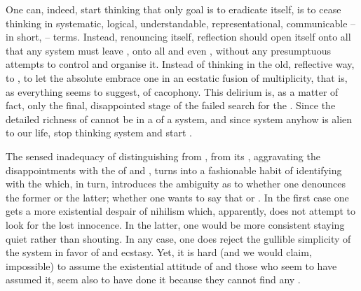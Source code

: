 One can, indeed, start thinking that  only goal is to eradicate
itself, is to cease thinking in systematic, logical, understandable, representational,
communicable -- in short,  -- terms.  Instead, renouncing itself,
reflection should open itself onto all that any system must leave ,
onto all  and even , without any
presumptuous attempts
to control and organise it. Instead of thinking in the old, reflective way, to
, to let the absolute  embrace one in an ecstatic
fusion of multiplicity, that is, as everything seems to suggest, of cacophony.
This delirium is, as a matter of fact, only the final, disappointed stage of the
failed search for the
. Since the detailed richness of  cannot be
 in a  of a system, and since system anyhow is
alien to our 
life, stop thinking system and start .

\pa 
The sensed inadequacy of distinguishing  from ,
 from its , aggravating the disappointments with the
 of  and , turns into a fashionable
habit of identifying  with  
the  which, in turn, introduces the ambiguity as to whether one 
denounces the former or the latter; whether one wants to say that  or . In the first 
case one gets a more existential despair of nihilism which, apparently, does not 
attempt to look for the lost innocence. 
In the latter, one would be more consistent staying quiet rather than
shouting. In any case, one does reject 
the gullible simplicity of the system in favor of  and 
 ecstasy. Yet, it is hard (and we would claim, impossible)
to assume the existential 
attitude of  and those who seem to have assumed it, seem
also to have done it because they cannot find any .

